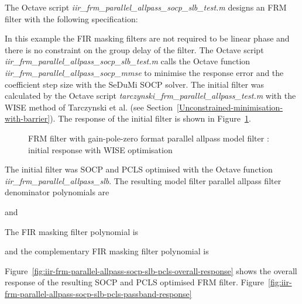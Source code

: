 \documentclass[a4paper,twoside,10pt,english]{report}
\begin{document}
The Octave script \emph{iir\_frm\_parallel\_allpass\_socp\_slb\_test.m} designs
an FRM filter with the following specification:
\begin{small}

\end{small}
In this example the FIR masking filters are not required to be linear phase 
and there is no constraint on the group delay of the filter. The Octave script
\emph{iir\_frm\_parallel\_allpass\_socp\_slb\_test.m} calls
the Octave function \emph{iir\_frm\_parallel\_allpass\_socp\_mmse} to minimise
the response error and the coefficient step size with the SeDuMi SOCP solver. 
The initial filter was calculated by the Octave script 
\emph{tarczynski\_frm\_parallel\_allpass\_test.m} with the WISE method of
Tarczynski et al. (see Section~\ref{Unconstrained-minimisation-with-barrier}).
The response of the initial filter is shown in 
Figure~\ref{fig:iir-frm-parallel-allpass-initial-response}.
\begin{figure}[!htbp]
\begin{center}
\scalebox{0.7}{}
\caption{FRM filter with gain-pole-zero format parallel allpass model filter : initial response with WISE optimisation}
\label{fig:iir-frm-parallel-allpass-initial-response}
\end{center}
\end{figure}
The initial filter was SOCP and PCLS optimised with the Octave function
\emph{iir\_frm\_parallel\_allpass\_slb}. The resulting model filter parallel 
allpass filter denominator polynomials are
\begin{small}

\end{small}
and
\begin{small}

\end{small}
The FIR masking filter polynomial is
\begin{small}

\end{small}
and the complementary FIR masking filter polynomial is
\begin{small}

\end{small}
Figure~\ref{fig:iir-frm-parallel-allpass-socp-slb-pcls-overall-response} 
shows the overall response of the resulting SOCP and PCLS optimised FRM filter. 
Figure~\ref{fig:iir-frm-parallel-allpass-socp-slb-pcls-passband-response} 
\end{document}
